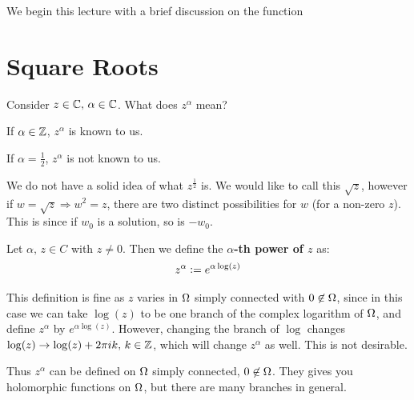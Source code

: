 \setcounter{section}{0}
\setcounter{theorem}{0}


We begin this lecture with a brief discussion on the function

\section{Square Roots}

Consider $z \in \mathbb{C}, \, \alpha \in \mathbb{C}$. What does $z^\alpha$ mean?

\begin{example}

If $\alpha \in \mathbb{Z}$, $z^\alpha$ is known to us.

\end{example}

\begin{example}
If $\alpha = \frac{1}{2}$, $z^\alpha$ is not known to us.
\end{example}

 We do not have a solid idea of what $z^\frac{1}{2}$ is. We would like to call this $\sqrt{z}$, however if $w = \sqrt{z} \Rightarrow w^2 = z$, there are two distinct possibilities for $w$ (for a non-zero $z$). This is since if $w_0$ is a solution, so is $-w_0$.
 
 \begin{definition}[Powers of $z$]
 Let $\alpha,\,z \in C$ with $z \neq 0$. Then we define the \textbf{$\alpha$-th power of $z$} as:
 \begin{align*}
     z^\alpha \vcentcolon = e^{\alpha \log(z)}
 \end{align*}
 \end{definition}
 
 
 \begin{remark}
 This definition is fine as $z$ varies in $\Omega$ simply connected with $0 \not\in \Omega$, since in this case we can take $\log(z)$ to be one branch of the complex logarithm of $\Omega$, and define $z^\alpha$ by $e^{\alpha \log(z)}$. However, changing the branch of $\log$ changes $\log(z) \to \log(z) + 2 \pi i k, \, k \in \mathbb{Z}$, which will change $z^\alpha$ as well. This is not desirable.
 \end{remark}
 
 
 Thus $z^ \alpha$ can be defined on $\Omega$ simply connected, $0 \not\in \Omega$. They gives you holomorphic functions on $\Omega$, but there are many branches in general.
 
